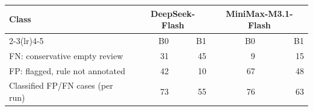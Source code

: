 \begin{tabular}{lrrrr}
\toprule
Class & \multicolumn{2}{c}{DeepSeek-Flash} & \multicolumn{2}{c}{MiniMax-M3.1-Flash} \\
\cmidrule(lr){2-3}\cmidrule(lr){4-5}
 & B0 & B1 & B0 & B1 \\
\midrule
FN: conservative empty review & 31 & 45 & 9 & 15 \\
FP: flagged, rule not annotated & 42 & 10 & 67 & 48 \\
\midrule
Classified FP/FN cases (per run) & 73 & 55 & 76 & 63 \\
\bottomrule
\end{tabular}
